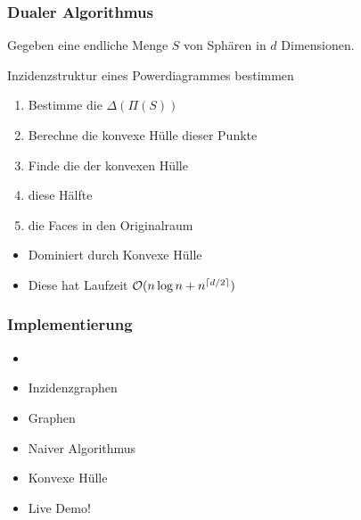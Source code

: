 \begin{frame}
    \frametitle{Dualer Algorithmus}

    Gegeben eine endliche Menge $S$ von Sphären in $d$ Dimensionen.

    \vfill

    \begin{block}{Inzidenzstruktur eines Powerdiagrammes bestimmen}
        \begin{enumerate}
            \item Bestimme die  $\Delta(\Pi(S))$
            \item Berechne die \alert{konvexe Hülle} dieser Punkte
            \item Finde die  der konvexen Hülle
            \item {} diese Hälfte
            \item {} die Faces in den Originalraum
        \end{enumerate}
    \end{block}

    \vfill

    \begin{itemize}
        \item Dominiert durch Konvexe Hülle
        \item Diese hat Laufzeit $\mathcal{O}(n \log n + n^{\left\lceil d/2\right\rceil})$
    \end{itemize}
\end{frame}

\begin{frame}
    \frametitle{Implementierung}

    \begin{itemize}
        \item \CCe
        \item Inzidenzgraphen
        \item Graphen
        \item Naiver Algorithmus
        \item Konvexe Hülle
        \item Live Demo!
    \end{itemize}
\end{frame}


